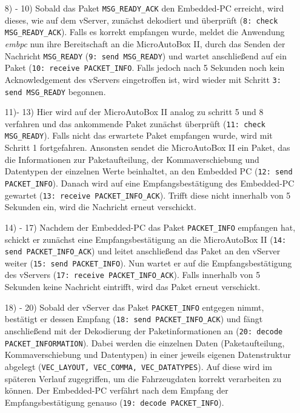 \documentclass[fontsize = 12pt, paper = a4]{scrreprt}
\begin{document}
\begin{itemize}
\item[8) - 10)]
Sobald das Paket \texttt{MSG\_READY\_ACK} den Embedded-PC erreicht, wird dieses, wie auf dem vServer, zunächst dekodiert und überprüft (\texttt{8: check MSG\_READY\_ACK}). Falls es korrekt empfangen wurde, meldet die Anwendung \emph{embpc} nun ihre Bereitschaft an die MicroAutoBox II, durch das Senden der Nachricht \texttt{MSG\_READY} (\texttt{9: send MSG\_READY}) und wartet anschließend auf ein Paket (\texttt{10: receive PACKET\_INFO}. Falls jedoch nach 5 Sekunden noch kein Acknowledgement des vServers eingetroffen ist, wird wieder mit Schritt \texttt{3: send MSG\_READY} begonnen.

\item[11)- 13)]
Hier wird auf der MicroAutoBox II analog zu schritt 5 und 8 verfahren und das ankommende Paket zunächst überprüft (\texttt{11: check MSG\_READY}). Falls nicht das erwartete Paket empfangen wurde, wird mit Schritt 1 fortgefahren. Ansonsten sendet die MicroAutoBox II ein Paket, das die Informationen zur Paketaufteilung, der Kommaverschiebung  und Datentypen der einzelnen Werte beinhaltet, an den Embedded PC (\texttt{12: send PACKET\_INFO}). Danach wird auf eine Empfangsbestätigung des Embedded-PC gewartet (\texttt{13: receive PACKET\_INFO\_ACK}). Trifft diese nicht innerhalb von 5 Sekunden ein, wird die Nachricht erneut verschickt. 

\item[14) - 17)]
Nachdem der Embedded-PC das Paket \texttt{PACKET\_INFO} empfangen hat, schickt er zunächst eine Empfangsbestätigung an die MicroAutoBox II (\texttt{14: send PACKET\_INFO\_ACK}) und leitet anschließend das Paket an den vServer weiter (\texttt{15: send PACKET\_INFO}). Nun wartet er auf die Empfangsbestätigung des vServers (\texttt{17: receive PACKET\_INFO\_ACK}). Falls innerhalb von 5 Sekunden keine Nachricht eintrifft, wird das Paket erneut verschickt.

\item[18) - 20)]
Sobald der vServer das Paket \texttt{PACKET\_INFO} entgegen nimmt, bestätigt er dessen Empfang (\texttt{18: send PACKET\_INFO\_ACK}) und fängt anschließend mit der Dekodierung der Paketinformationen an (\texttt{20: decode PACKET\_INFORMATION}). Dabei werden die einzelnen Daten (Paketaufteilung, Kommaverschiebung und Datentypen) in einer jeweils eigenen Datenstruktur abgelegt (\texttt{VEC\_LAYOUT, VEC\_COMMA, VEC\_DATATYPES}). Auf diese wird im späteren Verlauf zugegriffen, um die Fahrzeugdaten korrekt verarbeiten zu können. Der Embedded-PC verfährt nach dem Empfang der Empfangsbestätigung genauso (\texttt{19: decode PACKET\_INFO}).

\end{itemize}
\end{document}

